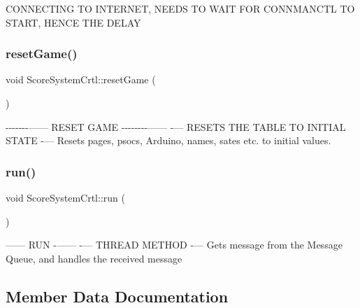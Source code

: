 C\+O\+N\+N\+E\+C\+T\+I\+NG TO I\+N\+T\+E\+R\+N\+ET, N\+E\+E\+DS TO W\+A\+IT F\+OR C\+O\+N\+N\+M\+A\+N\+C\+TL TO S\+T\+A\+RT, H\+E\+N\+CE T\+HE D\+E\+L\+AY \mbox{\label{class_score_system_crtl_a2de992b7e2734b0be919da1bc460ea48}} 
\subsubsection{\texorpdfstring{reset\+Game()}{resetGame()}}
{\footnotesize\ttfamily void Score\+System\+Crtl\+::reset\+Game (\begin{DoxyParamCaption}{ }\end{DoxyParamCaption})\hspace{0.3cm}{\ttfamily [private]}}

-\/-\/-\/-\/-\/-\/-\/------ R\+E\+S\+ET G\+A\+ME -\/-\/-\/-\/-\/-\/-\/-\/------ -\/--- R\+E\+S\+E\+TS T\+HE T\+A\+B\+LE TO I\+N\+I\+T\+I\+AL S\+T\+A\+TE -\/--- Resets pages, psocs, Arduino, names, sates etc. to initial values. \mbox{\label{class_score_system_crtl_a04176fe6a2ed0c8fdfb4394426357d76}} 
\subsubsection{\texorpdfstring{run()}{run()}}
{\footnotesize\ttfamily void Score\+System\+Crtl\+::run (\begin{DoxyParamCaption}{ }\end{DoxyParamCaption})\hspace{0.3cm}{\ttfamily [private]}}

------ R\+UN -\/------ -\/--- T\+H\+R\+E\+AD M\+E\+T\+H\+OD -\/--- Gets message from the Message Queue, and handles the received message 

\subsection{Member Data Documentation}
\mbox{\label{class_score_system_crtl_aa4b1c98fb3cddcc8d41c575cabb6115f}} 
